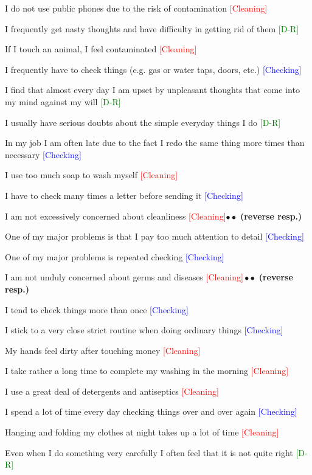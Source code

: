 \documentclass{beamer}
\def\itvvs{\vspace{-.15cm}\item}
\def\rtxt#1{\textcolor{red}{#1}}
\def\btxt#1{\textcolor{blue}{#1}}
\def\grtxt#1{\textcolor{green}{#1}}
\begin{document}
\begin{frame}
\footnotesize
\begin{roster}
\itvvs I do not use public phones due to the risk of contamination \rtxt{[Cleaning]}
\itvvs I frequently get nasty thoughts and have difficulty in getting rid of them \grtxt{[D-R]}
\itvvs  If I touch an animal, I feel contaminated \rtxt{[Cleaning]}
\itvvs  I frequently have to check things (e.g. gas or water taps, doors, etc.) \btxt{[Checking]}
\itvvs  I find that almost every day I am upset by unpleasant thoughts that come into my mind against my will \grtxt{[D-R]}
\itvvs I usually have serious doubts about the simple everyday things I do \grtxt{[D-R]}
\itvvs  In my job I am often late due to the fact I redo the same thing more times than necessary  \btxt{[Checking]}
\itvvs  I use too much soap to wash myself \rtxt{[Cleaning]}
\itvvs  I have to check many times a letter before sending it  \btxt{[Checking]}
\itvvs I am not excessively concerned about cleanliness \rtxt{[Cleaning]}\qquad$\bullet\bullet$ {\bf (reverse resp.)}
\itvvs  One of my major problems is that I pay too much attention to detail  \btxt{[Checking]}
\itvvs One of  my major problems is repeated checking  \btxt{[Checking]}
\itvvs  I am not unduly concerned about germs and diseases \rtxt{[Cleaning]}\,$\bullet\bullet$
{\bf (reverse resp.)}
\itvvs  I tend to check things more than once  \btxt{[Checking]}
\itvvs  I stick to a very close strict routine when doing ordinary things  \btxt{[Checking]}
\itvvs  My hands feel dirty after touching money \rtxt{[Cleaning]}
\itvvs  I take rather a long time to complete my washing in the morning \rtxt{[Cleaning]}
\itvvs  I use a great deal of detergents and antiseptics \rtxt{[Cleaning]}
\itvvs  I spend a lot of time every day checking things over and over again  \btxt{[Checking]}
\itvvs  Hanging and folding my clothes at night takes up a lot of time \rtxt{[Cleaning]}
\itvvs  Even when I do something very carefully I often feel that it is not quite right \grtxt{[D-R]}
%
\end{roster}

\end{frame}
\end{document}
